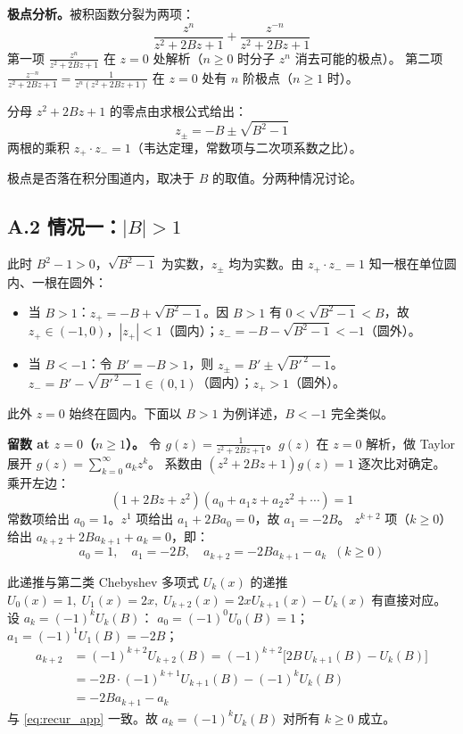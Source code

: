 \documentclass[12pt,a4paper]{ctexart}
\begin{document}
\textbf{极点分析。}被积函数分裂为两项：
\begin{equation}
\frac{z^n}{z^2+2Bz+1}+\frac{z^{-n}}{z^2+2Bz+1}
\end{equation}
第一项 $\frac{z^n}{z^2+2Bz+1}$ 在 $z=0$ 处解析（$n\geq0$ 时分子 $z^n$ 消去可能的极点）。
第二项 $\frac{z^{-n}}{z^2+2Bz+1}=\frac{1}{z^n(z^2+2Bz+1)}$ 在 $z=0$ 处有 $n$ 阶极点（$n\geq1$ 时）。

分母 $z^2+2Bz+1$ 的零点由求根公式给出：
\begin{equation}
z_{\pm}=-B\pm\sqrt{B^2-1}
\end{equation}
两根的乘积 $z_+\cdot z_-=1$（韦达定理，常数项与二次项系数之比）。

极点是否落在积分围道内，取决于 $B$ 的取值。分两种情况讨论。

\subsection*{A.2 情况一：$|B|>1$}

此时 $B^2-1>0$，$\sqrt{B^2-1}$ 为实数，$z_{\pm}$ 均为实数。由 $z_+\cdot z_-=1$ 知一根在单位圆内、一根在圆外：
\begin{itemize}
\item 当 $B>1$：$z_+=-B+\sqrt{B^2-1}$。因 $B>1$ 有 $0<\sqrt{B^2-1}<B$，故 $z_+\in(-1,0)$，$|z_+|<1$（圆内）；$z_-=-B-\sqrt{B^2-1}<-1$（圆外）。
\item 当 $B<-1$：令 $B'=-B>1$，则 $z_{\pm}=B'\pm\sqrt{B'^{\,2}-1}$。$z_-=B'-\sqrt{B'^{\,2}-1}\in(0,1)$（圆内）；$z_+>1$（圆外）。
\end{itemize}
此外 $z=0$ 始终在圆内。下面以 $B>1$ 为例详述，$B<-1$ 完全类似。

\medskip
\noindent\textbf{留数 at $z=0$（$n\geq1$）。}
令 $g(z)=\frac{1}{z^2+2Bz+1}$。$g(z)$ 在 $z=0$ 解析，做 Taylor 展开 $g(z)=\sum_{k=0}^{\infty}a_k z^k$。
系数由 $(z^2+2Bz+1)g(z)=1$ 逐次比对确定。乘开左边：
\begin{equation}
(1+2Bz+z^2)(a_0+a_1z+a_2z^2+\cdots)=1
\end{equation}
常数项给出 $a_0=1$。$z^1$ 项给出 $a_1+2Ba_0=0$，故 $a_1=-2B$。
$z^{k+2}$ 项（$k\geq0$）给出 $a_{k+2}+2B a_{k+1}+a_k=0$，即：
\begin{equation}\label{eq:recur_app}
a_0=1,\quad a_1=-2B,\quad a_{k+2}=-2B a_{k+1}-a_k\;\;(k\geq0)
\end{equation}

此递推与第二类 Chebyshev 多项式 $U_k(x)$ 的递推
$U_0(x)=1,\;U_1(x)=2x,\;U_{k+2}(x)=2xU_{k+1}(x)-U_k(x)$
有直接对应。设 $a_k=(-1)^kU_k(B)$：
$a_0=(-1)^0U_0(B)=1$；$a_1=(-1)^1U_1(B)=-2B$；
\begin{equation}
\begin{aligned}
a_{k+2}&=(-1)^{k+2}U_{k+2}(B)
       =(-1)^{k+2}\big[2B\,U_{k+1}(B)-U_k(B)\big] \\[2pt]
       &=-2B\cdot(-1)^{k+1}U_{k+1}(B)-(-1)^kU_k(B) \\[2pt]
       &=-2B a_{k+1}-a_k
\end{aligned}
\end{equation}
与 \eqref{eq:recur_app} 一致。故 $a_k=(-1)^kU_k(B)$ 对所有 $k\geq0$ 成立。
\end{document}
